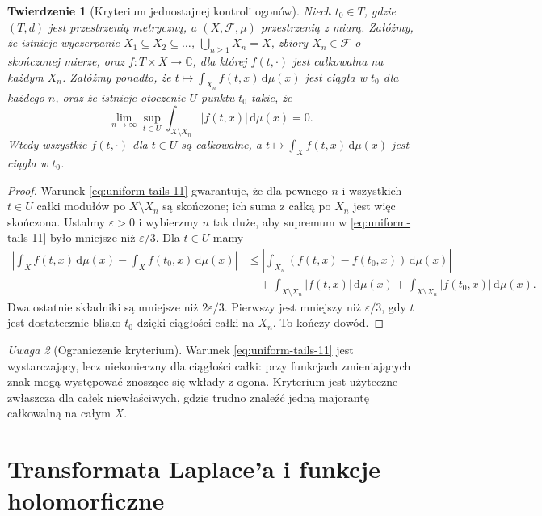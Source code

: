 \documentclass[11pt,a4paper,oneside]{book}
\numberwithin{equation}{chapter}
\theoremstyle{plain}
\newtheorem{twierdzenie}{Twierdzenie}[chapter]
\theoremstyle{definition}
\theoremstyle{remark}
\newtheorem{uwaga}[twierdzenie]{Uwaga}
\begin{document}
\begin{twierdzenie}[Kryterium jednostajnej kontroli ogonów]
\label{thm:tails-11}
Niech $t_0\in T$, gdzie $(T,d)$ jest przestrzenią metryczną,
a $(X,\mathcal F,\mu)$ przestrzenią z miarą. Załóżmy, że
istnieje wyczerpanie $X_1\subseteq X_2\subseteq\dots$,
$\bigcup_{n\ge1}X_n=X$, zbiory $X_n\in\mathcal F$
o skończonej mierze, oraz $f:T\times X\to\mathbb C$,
dla której $f(t,\cdot)$ jest całkowalna na każdym $X_n$.
Załóżmy ponadto, że $t\mapsto\int_{X_n}f(t,x)\,\mathrm d\mu(x)$
jest ciągła w $t_0$ dla każdego $n$, oraz że istnieje
otoczenie $U$ punktu $t_0$ takie, że
\begin{equation}\label{eq:uniform-tails-11}
\lim_{n\to\infty}\sup_{t\in U}
\int_{X\setminus X_n}|f(t,x)|\,\mathrm d\mu(x)=0.
\end{equation}
Wtedy wszystkie $f(t,\cdot)$ dla $t\in U$ są całkowalne,
a $t\mapsto\int_Xf(t,x)\,\mathrm d\mu(x)$ jest ciągła w $t_0$.
\end{twierdzenie}
\begin{proof}
Warunek \eqref{eq:uniform-tails-11} gwarantuje, że dla
pewnego $n$ i wszystkich $t\in U$ całki modułów po
$X\setminus X_n$ są skończone; ich suma z całką po $X_n$
jest więc skończona. Ustalmy $\varepsilon>0$ i wybierzmy
$n$ tak duże, aby supremum w
\eqref{eq:uniform-tails-11} było mniejsze niż $\varepsilon/3$.
Dla $t\in U$ mamy
\begin{align*}
\left|\int_Xf(t,x)\,\mathrm d\mu(x)-\int_Xf(t_0,x)\,\mathrm d\mu(x)\right|
&\le\left|\int_{X_n}(f(t,x)-f(t_0,x))\,\mathrm d\mu(x)\right|\\
&\quad+\int_{X\setminus X_n}|f(t,x)|\,\mathrm d\mu(x)
+\int_{X\setminus X_n}|f(t_0,x)|\,\mathrm d\mu(x).
\end{align*}
Dwa ostatnie składniki są mniejsze niż $2\varepsilon/3$.
Pierwszy jest mniejszy niż $\varepsilon/3$, gdy $t$
jest dostatecznie blisko $t_0$ dzięki ciągłości
całki na $X_n$. To kończy dowód.
\end{proof}

\begin{uwaga}[Ograniczenie kryterium]
Warunek \eqref{eq:uniform-tails-11} jest wystarczający, lecz
niekonieczny dla ciągłości całki: przy funkcjach zmieniających
znak mogą występować znoszące się wkłady z ogona.
Kryterium jest użyteczne zwłaszcza dla całek niewłaściwych,
gdzie trudno znaleźć jedną majorantę całkowalną na całym $X$.
\end{uwaga}

\section{Transformata Laplace'a i funkcje holomorficzne}
\end{document}
